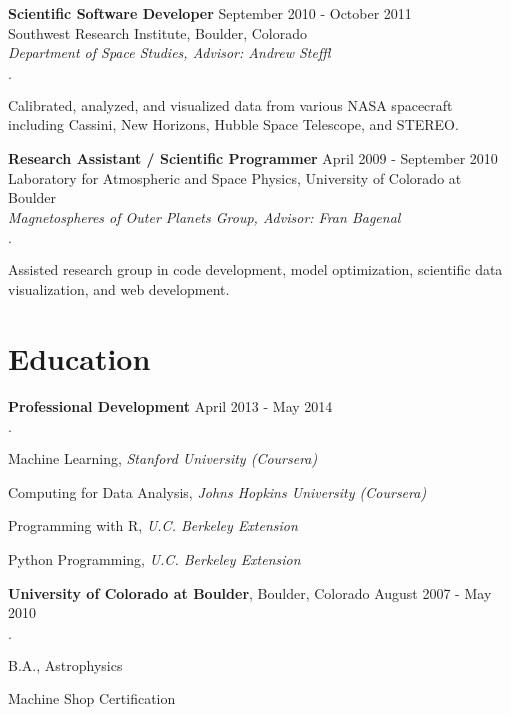 \documentclass[margin,line]{res}
\newenvironment{list2}{
  \begin{list}{$\cdot$}{%
      \setlength{\itemsep}{0in}
      \setlength{\parsep}{0in} \setlength{\parskip}{0in}
      \setlength{\topsep}{0in} \setlength{\partopsep}{0in} 
      \setlength{\leftmargin}{0.2in}}}{\end{list}}
\begin{document}
\begin{resume}
{\bf Scientific Software Developer} \hfill {September 2010 - October 2011}\\
Southwest Research Institute, Boulder, Colorado\\
{\em Department of Space Studies, Advisor: Andrew Steffl}
\begin{list2}
\item Calibrated, analyzed, and visualized data from various NASA spacecraft including Cassini, New Horizons, Hubble Space Telescope, and STEREO.
\end{list2}

{\bf Research Assistant / Scientific Programmer} \hfill {April 2009 - September 2010}\\
Laboratory for Atmospheric and Space Physics, University of Colorado at Boulder\\
{\em Magnetospheres of Outer Planets Group, Advisor: Fran Bagenal}
\begin{list2}
\item Assisted research group in code development, model optimization, scientific data visualization, and web development.
\end{list2}


\section{\sc Education}

{\bf Professional Development} \hfill {April 2013 - May 2014}\\
\vspace*{-.15in}
\begin{list2}
\item Machine Learning, {\em Stanford University (Coursera)}
\item Computing for Data Analysis, {\em Johns Hopkins University (Coursera)}
\item Programming with R, {\em U.C. Berkeley Extension}
\item Python Programming, {\em U.C. Berkeley Extension}
\end{list2}

{\bf University of Colorado at Boulder}, Boulder, Colorado \hfill {August 2007 - May 2010}\\
\vspace*{-.15in}
\begin{list2}
\item B.A., Astrophysics
\item Machine Shop Certification
\end{list2}


\end{resume}
\end{document}
